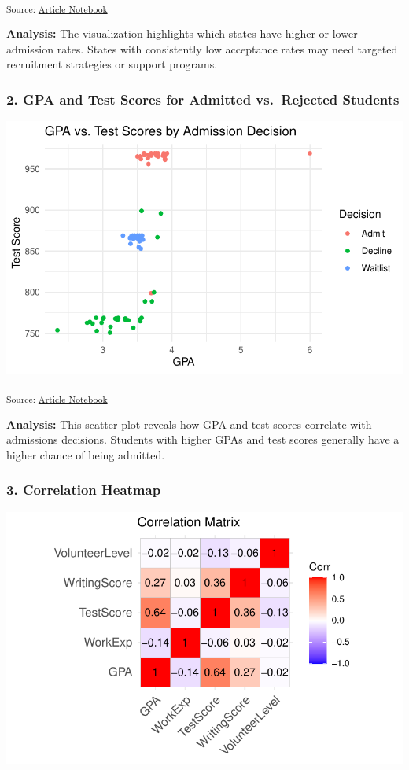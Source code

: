 \documentclass[
  letterpaper,
  DIV=11,
  numbers=noendperiod]{scrartcl}
\begin{document}
\textsubscript{Source:
\href{https://verkyyi.github.io/5900-hw1/index.qmd.html}{Article
Notebook}}

\textbf{Analysis:} The visualization highlights which states have higher
or lower admission rates. States with consistently low acceptance rates
may need targeted recruitment strategies or support programs.

\subsubsection{2. GPA and Test Scores for Admitted vs.~Rejected
Students}\label{gpa-and-test-scores-for-admitted-vs.-rejected-students}

\includegraphics{index_files/figure-pdf/gpa-testscore-distribution-1.pdf}

\textsubscript{Source:
\href{https://verkyyi.github.io/5900-hw1/index.qmd.html}{Article
Notebook}}

\textbf{Analysis:} This scatter plot reveals how GPA and test scores
correlate with admissions decisions. Students with higher GPAs and test
scores generally have a higher chance of being admitted.

\subsubsection{3. Correlation Heatmap}\label{correlation-heatmap}

\includegraphics{index_files/figure-pdf/correlation-heatmap-1.pdf}
\end{document}
